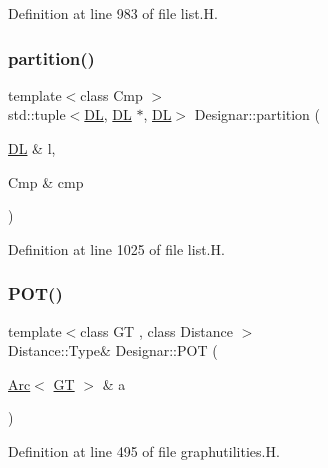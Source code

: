 Definition at line 983 of file list.\+H.

\mbox{\label{namespace_designar_af9be3d9a9287bf17a54090b14c06c611}} 
\subsubsection{\texorpdfstring{partition()}{partition()}\hspace{0.1cm}{\footnotesize\ttfamily [3/3]}}
{\footnotesize\ttfamily template$<$class Cmp $>$ \\
std\+::tuple$<$\hyperlink{class_designar_1_1_d_l}{DL}, \hyperlink{class_designar_1_1_d_l}{DL} $\ast$, \hyperlink{class_designar_1_1_d_l}{DL}$>$ Designar\+::partition (\begin{DoxyParamCaption}\item[{\hyperlink{class_designar_1_1_d_l}{DL} \&}]{l,  }\item[{Cmp \&}]{cmp }\end{DoxyParamCaption})\hspace{0.3cm}{\ttfamily [inline]}}



Definition at line 1025 of file list.\+H.

\mbox{\label{namespace_designar_afa0b0cf6848e8b604d27c630db119b29}} 
\subsubsection{\texorpdfstring{P\+O\+T()}{POT()}}
{\footnotesize\ttfamily template$<$class GT , class Distance $>$ \\
Distance\+::\+Type\& Designar\+::\+P\+OT (\begin{DoxyParamCaption}\item[{\hyperlink{namespace_designar_a3f55fb5513d62ff47cbc8f72b8e95d6f}{Arc}$<$ \hyperlink{demo-buildgraph_8_c_a3001c40d2c31ca87ed96cd7d1334a55e}{GT} $>$ \&}]{a }\end{DoxyParamCaption})\hspace{0.3cm}{\ttfamily [inline]}}



Definition at line 495 of file graphutilities.\+H.

\mbox{\label{namespace_designar_a94eeb5e794c32c27a0efc3e2218e9278}} 

